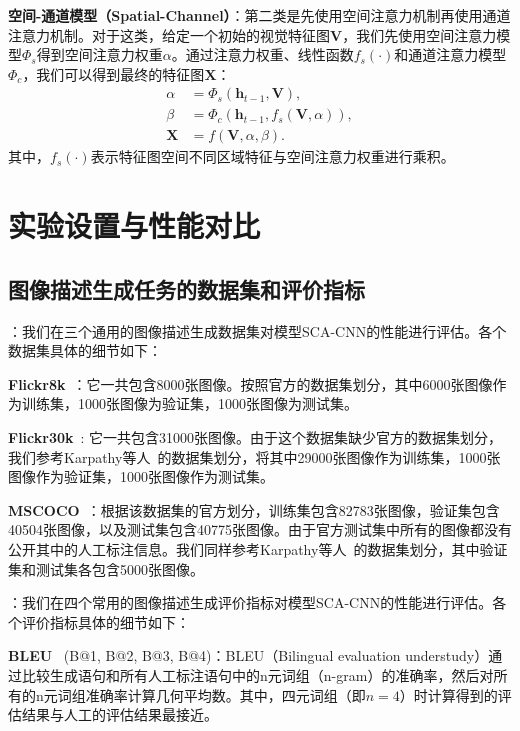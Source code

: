 \textbf{空间-通道模型（Spatial-Channel）}：第二类是先使用空间注意力机制再使用通道注意力机制。对于这类，给定一个初始的视觉特征图$\bm{V}$，我们先使用空间注意力模型$\Phi_s$得到空间注意力权重$\alpha$。通过注意力权重、线性函数$f_s(\cdot)$和通道注意力模型$\Phi_c$，我们可以得到最终的特征图$\bm{X}$：
\begin{equation} \label{ch5:eq:eq_9}
\begin{split}
\alpha &= \Phi_s \left(\bm{h}_{t-1}, \bm{V} \right), \\
\beta &= \Phi_c \left(\bm{h}_{t-1}, f_s \left(\bm{V}, \alpha \right) \right), \\
\bm{X} &= f \left(\bm{V}, \alpha, \beta \right).
\end{split}
\end{equation}
其中，$f_s(\cdot)$表示特征图空间不同区域特征与空间注意力权重进行乘积。


\section{实验设置与性能对比}
\subsection{图像描述生成任务的数据集和评价指标}

\textbf{}：我们在三个通用的图像描述生成数据集对模型SCA-CNN的性能进行评估。各个数据集具体的细节如下：

\textbf{Flickr8k}~\cite{hodosh2013framing}：它一共包含8000张图像。按照官方的数据集划分，其中6000张图像作为训练集，1000张图像为验证集，1000张图像为测试集。

\textbf{Flickr30k}~\cite{young2014image}: 它一共包含31000张图像。由于这个数据集缺少官方的数据集划分，我们参考Karpathy等人~\cite{karpathy2015deep}的数据集划分，将其中29000张图像作为训练集，1000张图像作为验证集，1000张图像作为测试集。

\textbf{MSCOCO}~\cite{lin2014microsoft}：根据该数据集的官方划分，训练集包含82783张图像，验证集包含40504张图像，以及测试集包含40775张图像。由于官方测试集中所有的图像都没有公开其中的人工标注信息。我们同样参考Karpathy等人~\cite{karpathy2015deep}的数据集划分，其中验证集和测试集各包含5000张图像。

\textbf{}：我们在四个常用的图像描述生成评价指标对模型SCA-CNN的性能进行评估。各个评价指标具体的细节如下：

\textbf{BLEU}~\cite{papineni2002bleu} (B@1, B@2, B@3, B@4)：BLEU（Bilingual evaluation understudy）通过比较生成语句和所有人工标注语句中的n元词组（n-gram）的准确率，然后对所有的n元词组准确率计算几何平均数。其中，四元词组（即$n=4$）时计算得到的评估结果与人工的评估结果最接近。


